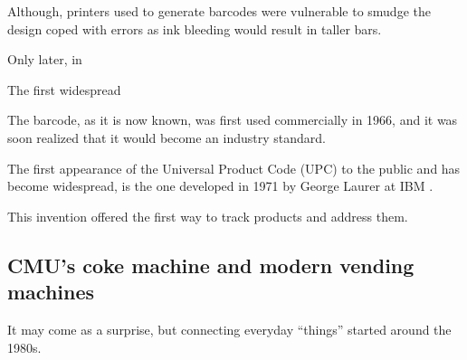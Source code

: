 		Although, printers used to generate barcodes were vulnerable to smudge the design coped with errors as ink bleeding would result in taller bars.
		

		Only later, in 

		The first widespread 
	
		The barcode, as it is now known, was first used commercially in 1966, and it was soon realized that it would become an industry standard.
		
		The first appearance of the Universal Product Code (UPC) to the public and has become widespread, is the one developed in 1971 by George Laurer at IBM \cite{upc_ibm}.
		
		This invention offered the first way to track products and address them.
		


	\subsection{CMU's coke machine and modern vending machines}


		It may come as a surprise, but connecting everyday ``things'' started around the 1980s.
		
